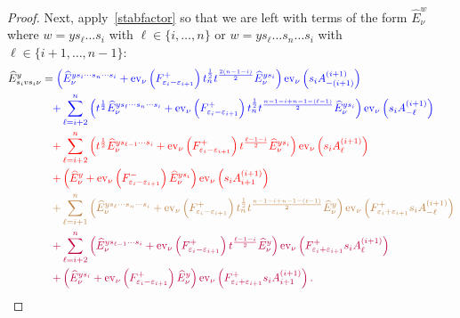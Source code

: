 \documentclass[11pt]{article}
\theoremstyle{plain}
\theoremstyle{definition}
\theoremstyle{remark}
\numberwithin{equation}{section}
\def\ev{\mathrm{ev}}
\newcounter{r}
\newcounter{s}
\begin{document}
\begin{proof}
Next, apply~\eqref{stabfactor} so that we are left with terms of the form $\widehat{E}^w_\nu$ where $w=ys_\ell \ldots s_i$ 
with $\ell\in \{i, \ldots, n\}$
or $w=ys_\ell \ldots s_n \ldots s_i$ with $\ell\in \{i+1, \ldots, n-1\}$:
\begin{align}
\widehat{E}^y_{s_ivs_i\nu}
&= 
{\color{blue} 
\left(\widehat{E}^{ys_i\cdots s_n\cdots s_i}_{\nu}
+\ev_\nu\left(F_{\varepsilon_i-\varepsilon_{i+1}}^+\right) t_n^{\frac12}t^{\frac{2(n-1-i)}{2}}
\widehat{E}^{ys_i}_{\nu}\right) \ev_\nu\left(s_iA^{(i+1)}_{-(i+1)}\right)  } 
\nonumber \\
&\quad
{\color{blue} 
+ \sum_{\ell=i+2}^n 
\left(t^{\frac12}\widehat{E}^{ys_\ell\cdots s_n\cdots s_i}_{\nu}
+\ev_\nu\left(F_{\varepsilon_i-\varepsilon_{i+1}}^+ \right)
t_n^{\frac12} t^{\frac{n-1-i+n-1-(\ell-1)}{2}}  \widehat{E}^{ys_i}_{\nu}
\right)\ev_\nu\left(s_iA^{(i+1)}_{-\ell}\right)
}
\nonumber \\
&\quad
{\color{red} 
+\sum_{\ell=i+2}^n 
\left(t^{\frac12}\widehat{E}^{ys_{\ell-1}\cdots s_i}_{\nu}
+\ev_\nu\left(F_{\varepsilon_i-\varepsilon_{i+1}}^+\right) 
t^{\frac{\ell-1-i}{2}}  \widehat{E}^{ys_i}_{\nu}\right)
\ev_\nu \left(s_iA^{(i+1)}_{\ell}\right) }
\nonumber \\
&\quad
{\color{red} 
+ \left(\widehat{E}^y_{\nu}
+\ev_\nu\left(F_{\varepsilon_i-\varepsilon_{i+1}}^- \right) \widehat{E}^{ys_i}_{\nu}\right)
\ev_\nu \left(s_iA^{(i+1)}_{i+1}\right)
}
\nonumber \\
&\quad
{\color{brown} 
+\sum_{\ell=i+1}^n 
\left(\widehat{E}^{ys_\ell\cdots s_n\cdots s_i}_{\nu}
+\ev_\nu\left(F_{\varepsilon_i-\varepsilon_{i+1}}^+\right) t_n^{\frac12} 
t^{\frac{n-1-i+n-1-(\ell-1)}{2}}  \widehat{E}^{y}_{\nu}
\right)
\ev_\nu\left(F_{\varepsilon_i+\varepsilon_{i+1}}^+ s_iA^{(i+1)}_{-\ell}\right)
}
\nonumber \\
&\quad
{\color{purple} 
+\sum_{\ell=i+2}^n 
\left(\widehat{E}^{ys_{\ell-1}\cdots s_i}_{\nu}
+\ev_\nu\left(F_{\varepsilon_i-\varepsilon_{i+1}}^+\right) 
t^{\frac{\ell-1-i}{2}}  \widehat{E}^{y}_{\nu}
\right)
\ev_\nu\left(F_{\varepsilon_i+\varepsilon_{i+1}}^+ s_iA^{(i+1)}_{\ell}\right)
 } 
 \nonumber \\
 &\quad
{\color{purple} 
+\left(\widehat{E}^{ys_i}_{\nu}
+\ev_\nu\left(F_{\varepsilon_i-\varepsilon_{i+1}}^+ \right)\widehat{E}^{y}_{\nu}\right)
\ev_\nu\left(F_{\varepsilon_i+\varepsilon_{i+1}}^+ s_iA^{(i+1)}_{i+1}\right).
}
\label{Prop511pf}
\end{align}


\end{proof}
\end{document}
